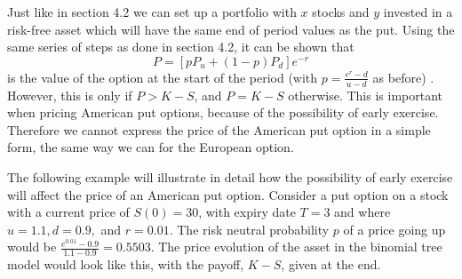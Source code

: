 \documentclass[letterpaper,12pt]{article}
\theoremstyle{plain}
\numberwithin{equation}{section}
\begin{document}
\begin{figure}[H]
\centering
{}
\end{figure}


Just like in section 4.2 we can set up a portfolio with $x$ stocks and $y$ invested in a risk-free asset which will have the same end of period values as the put. Using the same series of steps as done in section 4.2, it can be shown that
\begin{equation}
	P = [pP_u + (1-p)P_d]e^{-r}
\end{equation}
is the value of the option at the start of the period (with $p = \frac{e^r-d}{u-d}$ as before) \cite{CRR}. However, this is only if $P>K-S$, and $P=K-S$ otherwise. This is important when pricing American put options, because of the possibility of early exercise. Therefore we cannot express the price of the American put option in a simple form, the same way we can for the European option.

The following example will illustrate in detail how the possibility of early exercise will affect the price of an American put option. Consider a put option on a stock with a current price of $S(0) = 30$, with expiry date $T = 3$ and where $u = 1.1, d = 0.9, $ and $r = 0.01$. The risk neutral probability $p$ of a price going up would be $\frac{e^0.01 - 0.9}{1.1-0.9} = 0.5503$. The price evolution of the asset in the binomial tree model would look like this, with the payoff, $K-S$, given at the end.
\end{document}
